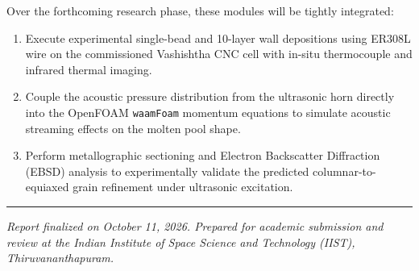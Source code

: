\documentclass[10pt,a4paper]{article}
\begin{document}
Over the forthcoming research phase, these modules will be tightly integrated:
\begin{enumerate}
    \item Execute experimental single-bead and 10-layer wall depositions using ER308L wire on the commissioned Vashishtha CNC cell with in-situ thermocouple and infrared thermal imaging.
    \item Couple the acoustic pressure distribution from the ultrasonic horn directly into the OpenFOAM \texttt{waamFoam} momentum equations to simulate acoustic streaming effects on the molten pool shape.
    \item Perform metallographic sectioning and Electron Backscatter Diffraction (EBSD) analysis to experimentally validate the predicted columnar-to-equiaxed grain refinement under ultrasonic excitation.
\end{enumerate}

\vspace{1.0em}
\noindent\rule{0.4\textwidth}{0.4pt}\par
\vspace{0.2em}
\noindent\small\textit{Report finalized on October 11, 2026. Prepared for academic submission and review at the Indian Institute of Space Science and Technology (IIST), Thiruvananthapuram.}
\end{document}
